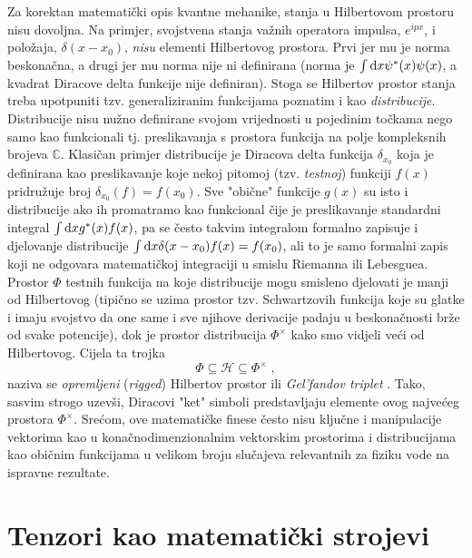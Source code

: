 Za korektan matematički opis kvantne mehanike, stanja u Hilbertovom
prostoru nisu dovoljna. Na primjer, svojstvena stanja važnih operatora
impulsa, $e^{i p x}$, i položaja, $\delta(x - x_0)$, \emph{nisu} elementi
Hilbertovog prostora. Prvi jer mu je norma beskonačna, a drugi jer mu
norma nije ni definirana (norma je $\int \textrm{d} x \psi^{*}(x) \psi(x)$,
a kvadrat Diracove delta funkcije nije definiran).
Stoga se Hilbertov prostor stanja treba upotpuniti tzv. generaliziranim
funkcijama poznatim i kao \emph{distribucije}. Distribucije nisu nužno
definirane svojom vrijednosti u pojedinim točkama nego samo kao funkcionali
tj. preslikavanja s prostora funkcija na polje kompleksnih brojeva $\mathbb{C}$.
Klasičan primjer distribucije je Diracova delta funkcija $\delta_{x_0}$ koja je definirana
kao preslikavanje koje nekoj pitomoj (tzv. \emph{testnoj}) funkciji $f(x)$
pridružuje broj $\delta_{x_0}(f) = f(x_0)$. Sve "obične" funkcije $g(x)$ su isto
i distribucije ako ih promatramo kao funkcional čije je preslikavanje 
standardni integral  $\int \textrm{d} x g^{*}(x) f(x)$,
pa se često takvim integralom formalno zapisuje i djelovanje distribucije
$\int \textrm{d} x \delta(x-x_0) f(x) = f(x_0)$, ali to je samo formalni zapis
koji ne odgovara matematičkoj integraciji u smislu Riemanna ili Lebesguea.
Prostor $\Phi$ testnih funkcija  na koje distribucije mogu smisleno djelovati je
manji od Hilbertovog (tipično se uzima prostor tzv. Schwartzovih funkcija koje su glatke
i imaju svojstvo da one same i sve njihove derivacije padaju u beskonačnosti brže od svake potencije),
dok je prostor
distribucija $\Phi^{\times}$ kako smo vidjeli veći od Hilbertovog.
Cijela ta trojka
\begin{equation}
    \Phi \subseteq \mathcal{H} \subseteq \Phi^{\times} \;,
    \label{eq:gelfand}
\end{equation}
naziva se \emph{opremljeni} (\emph{rigged}) Hilbertov prostor  ili
\emph{Gel'fandov triplet} \cite{Ballentine:1998}. Tako, sasvim strogo uzevši, Diracovi
"ket" simboli predstavljaju elemente ovog najvećeg prostora $\Phi^{\times}$.
Srećom, ove matematičke finese često nisu ključne i
manipulacije vektorima kao u konačnodimenzionalnim vektorskim prostorima i distribucijama
kao običnim funkcijama u velikom broju slučajeva relevantnih
za fiziku vode na ispravne rezultate.



\chapter{Tenzori kao matematički strojevi}
\label{sec:tenzorKaoStroj}

